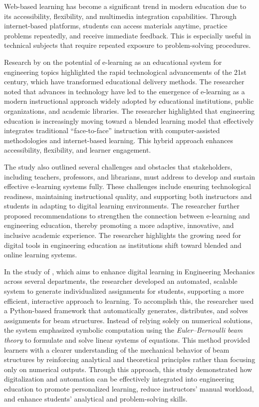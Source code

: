 Web-based learning has become a significant trend in modern education due to its accessibility, flexibility, and multimedia integration capabilities. Through internet-based platforms, students can access materials anytime, practice problems repeatedly, and receive immediate feedback. This is especially useful in technical subjects that require repeated exposure to problem-solving procedures.



Research by \cite{abumandour_applying_2021} on the potential of e-learning as an educational system for engineering topics highlighted the rapid technological advancements of the 21st century, which have transformed educational delivery methods. The researcher noted that advances in technology have led to the emergence of e-learning as a modern instructional approach widely adopted by educational institutions, public organizations, and academic libraries. The researcher highlighted that engineering education is increasingly moving toward a blended learning model that effectively integrates traditional ``face-to-face'' instruction with computer-assisted methodologies and internet-based learning. This hybrid approach enhances accessibility, flexibility, and learner engagement.

The study also outlined several challenges and obstacles that stakeholders, including teachers, professors, and librarians, must address to develop and sustain effective e-learning systems fully. These challenges include ensuring technological readiness, maintaining instructional quality, and supporting both instructors and students in adapting to digital learning environments. The researcher further proposed recommendations to strengthen the connection between e-learning and engineering education, thereby promoting a more adaptive, innovative, and inclusive academic experience. The researcher highlights the growing need for digital tools in engineering education as institutions shift toward blended and online learning systems.

In the study of \cite{sollradl_symbolic_nodate}, which aims to enhance digital learning in Engineering Mechanics across several departments, the researcher developed an automated, scalable system to generate individualized assignments for students, supporting a more efficient, interactive approach to learning. To accomplish this, the researcher used a Python-based framework that automatically generates, distributes, and solves assignments for beam structures. Instead of relying solely on numerical solutions, the system emphasized symbolic computation using the \textit{Euler--Bernoulli beam theory} to formulate and solve linear systems of equations. This method provided learners with a clearer understanding of the mechanical behavior of beam structures by reinforcing analytical and theoretical principles rather than focusing only on numerical outputs. Through this approach, this study demonstrated how digitalization and automation can be effectively integrated into engineering education to promote personalized learning, reduce instructors' manual workload, and enhance students' analytical and problem-solving skills.

